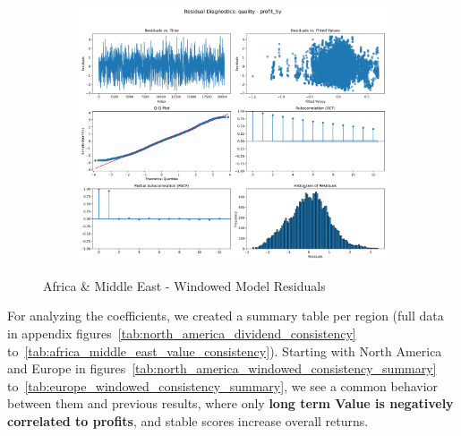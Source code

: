 \documentclass[11pt,english,a4paper,hidelinks]{book}
\begin{document}
\begin{figure}[H]
\begin{subfigure}[b]{0.32\textwidth}
    \end{subfigure}
    \hfill
    \begin{subfigure}[b]{0.32\textwidth}
        \centering
        \includegraphics[width=\textwidth]{images/code/models/linear_regression/first_model/AF/quality_profit_5y_residuals - Gaussian.png}
    \end{subfigure}
    \caption{Africa \& Middle East - Windowed Model Residuals}
    \label{fig:linear_regression_AF_residues_windowed}
\end{figure}

\noindent For analyzing the coefficients, we created a summary table per region (full data in appendix figures~\ref{tab:north_america_dividend_consistency} to~\ref{tab:africa_middle_east_value_consistency}). Starting with North America and Europe in figures~\ref{tab:north_america_windowed_consistency_summary} to~\ref{tab:europe_windowed_consistency_summary}, we see a common behavior between them and previous results, where only \textbf{long term Value is negatively correlated to profits}, and stable scores increase overall returns.
\end{document}
